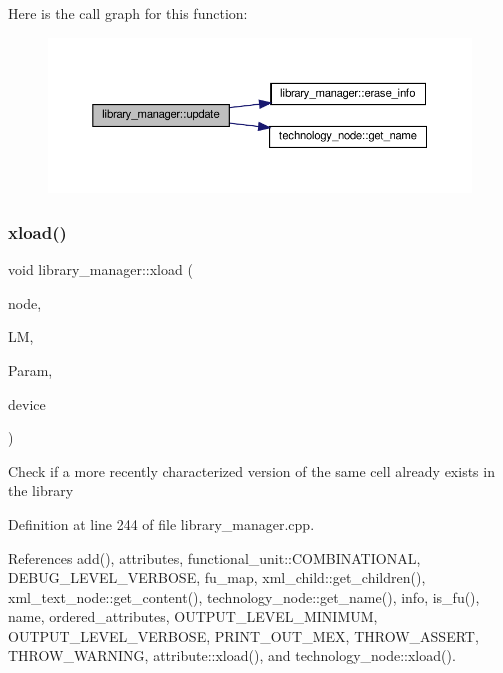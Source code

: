Here is the call graph for this function\+:
\nopagebreak
\begin{figure}[H]
\begin{center}
\leavevmode
\includegraphics[width=350pt]{d8/d35/classlibrary__manager_a390325203aa42f2c6d71f601fd1ba8f4_cgraph}
\end{center}
\end{figure}
\mbox{\label{classlibrary__manager_a2256397a16a3d834c1cf9921824316be}} 
\subsubsection{\texorpdfstring{xload()}{xload()}}
{\footnotesize\ttfamily void library\+\_\+manager\+::xload (\begin{DoxyParamCaption}\item[{const \hyperlink{classxml__element}{xml\+\_\+element} $\ast$}]{node,  }\item[{const \hyperlink{library__manager_8hpp_aacc6d633b0aa80ecfeb1180fd480ae68}{library\+\_\+manager\+Ref} \&}]{LM,  }\item[{const \hyperlink{Parameter_8hpp_a37841774a6fcb479b597fdf8955eb4ea}{Parameter\+Const\+Ref} \&}]{Param,  }\item[{const \hyperlink{target__device_8hpp_acedb2b7a617e27e6354a8049fee44eda}{target\+\_\+device\+Ref} \&}]{device }\end{DoxyParamCaption})\hspace{0.3cm}{\ttfamily [static]}}

Check if a more recently characterized version of the same cell already exists in the library 

Definition at line 244 of file library\+\_\+manager.\+cpp.



References add(), attributes, functional\+\_\+unit\+::\+C\+O\+M\+B\+I\+N\+A\+T\+I\+O\+N\+AL, D\+E\+B\+U\+G\+\_\+\+L\+E\+V\+E\+L\+\_\+\+V\+E\+R\+B\+O\+SE, fu\+\_\+map, xml\+\_\+child\+::get\+\_\+children(), xml\+\_\+text\+\_\+node\+::get\+\_\+content(), technology\+\_\+node\+::get\+\_\+name(), info, is\+\_\+fu(), name, ordered\+\_\+attributes, O\+U\+T\+P\+U\+T\+\_\+\+L\+E\+V\+E\+L\+\_\+\+M\+I\+N\+I\+M\+UM, O\+U\+T\+P\+U\+T\+\_\+\+L\+E\+V\+E\+L\+\_\+\+V\+E\+R\+B\+O\+SE, P\+R\+I\+N\+T\+\_\+\+O\+U\+T\+\_\+\+M\+EX, T\+H\+R\+O\+W\+\_\+\+A\+S\+S\+E\+RT, T\+H\+R\+O\+W\+\_\+\+W\+A\+R\+N\+I\+NG, attribute\+::xload(), and technology\+\_\+node\+::xload().



